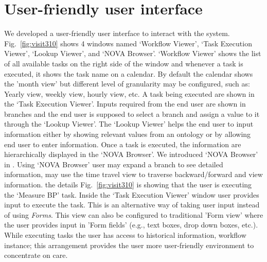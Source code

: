 \documentclass[a4paper]{llncs}
\begin{document}
\section{User-friendly user interface}
We developed a user-friendly user interface to interact with the system. 
Fig.~\ref{fig:visit310} shows 4 windows named `Workflow Viewer', `Task Execution Viewer', `Lookup Viewer', and `NOVA Browser'. 
`Workflow Viewer' shows the list of all available tasks on the right side of the window and whenever a task is executed, it shows the task name on a calendar. 
By default the calendar shows the 'month view' but different level of granularity may be configured, such as: Yearly view, weekly view, hourly view, etc. 
A task being executed are shown in the `Task Execution Viewer'. Inputs required from the end user are shown in branches and the end user is supposed to select a branch and assign a value to it 
through the `Lookup Viewer'. The `Lookup Viewer' helps the end user to input information either by showing relevant values from an ontology or by allowing end user to enter information. 
Once a task is executed, the information are hierarchically displayed in the `NOVA Browser'. %
We introduced `NOVA Browser' in \cite{MacCaullRabbi2011}. Using `NOVA Browser' user may expand a branch to see detailed information, may use the time travel view to traverse backward/forward and 
view information. the details
Fig.~\ref{fig:visit310} is showing that the user is executing the `Measure BP' task. 
Inside the `Task Execution Viewer' window user provides input to execute the task. 
This is an alternative way of taking user input instead of using \textit{Forms}. This view can also be configured to traditional 'Form view' where the user provides input in 'Form fields' 
(e.g., text boxes, drop down boxes, etc.). 
While executing tasks the user has access to historical information, workflow instance; this arrangement provides the user more user-friendly environment to 
concentrate on care.
\end{document}
